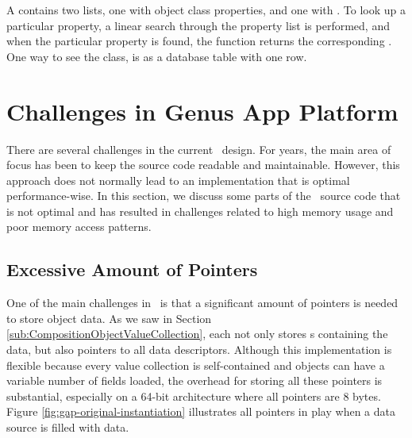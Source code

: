 A  contains two lists, one with object class properties, and one with . To look up a particular property, a linear search through the property list is performed, and when the particular property is found, the function returns the corresponding . One way to see the  class, is as a database table with one row.


\section{Challenges in Genus App Platform}
\label{sec:Challenges in Genus App Platform}

There are several challenges in the current \gap~design. For years, the main area of focus has been to keep the source code readable and maintainable. However, this approach does not normally lead to an implementation that is optimal performance-wise. In this section, we discuss some parts of the \gap~source code that is not optimal and has resulted in challenges related to high memory usage and poor memory access patterns.

\subsection{Excessive Amount of Pointers}
\label{sub:Excessive Amount of Pointers}

One of the main challenges in \gap~is that a significant amount of pointers is needed to store object data. As we saw in Section \ref{sub:CompositionObjectValueCollection}, each  not only stores s containing the data, but also pointers to all data descriptors. Although this implementation is flexible because every value collection is self-contained and objects can have a variable number of fields loaded, the overhead for storing all these pointers is substantial, especially on a 64-bit architecture where all pointers are 8 bytes. Figure \ref{fig:gap-original-instantiation} illustrates all pointers in play when a data source is filled with data. 

